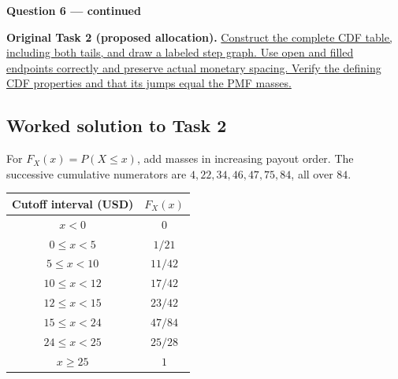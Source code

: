 \par\vspace{3mm}\secInicio[][sec:q6]

\clearpage
\textbf{Question 6 --- continued}

\textbf{Original Task 2 (proposed allocation).} \hyperref[sol:q6t2]{Construct the complete CDF table, including both tails, and draw a labeled step graph. Use open and filled endpoints correctly and preserve actual monetary spacing. Verify the defining CDF properties and that its jumps equal the PMF masses.} 


\subsection*{Worked solution to Task 2 }
\label{sol:q6t2}

For $F_X(x)=P(X\leq x)$, add masses in increasing payout order. The successive cumulative numerators are $4,22,34,46,47,75,84$, all over $84$.

\begin{center}
\begin{tabular}{cc}\toprule
Cutoff interval (USD) & $F_X(x)$\\\midrule
$x<0$ & $0$\\
$0\leq x<5$ & $1/21$\\
$5\leq x<10$ & $11/42$\\
$10\leq x<12$ & $17/42$\\
$12\leq x<15$ & $23/42$\\
$15\leq x<24$ & $47/84$\\
$24\leq x<25$ & $25/28$\\
$x\geq 25$ & $1$\\
\bottomrule\end{tabular}
\end{center}


